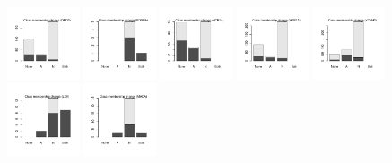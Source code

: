 \documentclass[10pt,article]{memoir}
\begin{document}
\begin{figure}[h!]
\includegraphics[width=0.19\textwidth]{figures/validation_plots/drd2_0p9_valplot.pdf}
\includegraphics[width=0.19\textwidth]{figures/validation_plots/ednra_0p9_valplot.pdf}
\includegraphics[width=0.19\textwidth]{figures/validation_plots/htr1a_0p9_valplot.pdf}
\includegraphics[width=0.19\textwidth]{figures/validation_plots/htr2a_0p9_valplot.pdf}
\includegraphics[width=0.19\textwidth]{figures/validation_plots/kcnh2_0p9_valplot.pdf}
\includegraphics[width=0.19\textwidth]{figures/validation_plots/lck_0p9_valplot.pdf}
\includegraphics[width=0.19\textwidth]{figures/validation_plots/maoa_0p9_valplot.pdf}

\end{figure}
\end{document}
